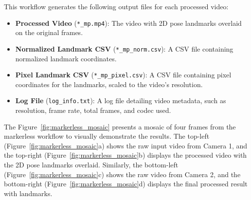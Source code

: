 \documentclass{article}
\begin{document}
This workflow generates the following output files for each processed video:

\begin{itemize}
    \item \textbf{Processed Video} (\texttt{*\_mp.mp4}): The video with 2D pose landmarks overlaid on the original frames.
    \item \textbf{Normalized Landmark CSV} (\texttt{*\_mp\_norm.csv}): A CSV file containing normalized landmark coordinates.
    \item \textbf{Pixel Landmark CSV} (\texttt{*\_mp\_pixel.csv}): A CSV file containing pixel coordinates for the landmarks, scaled to the video’s resolution.
    \item \textbf{Log File} (\texttt{log\_info.txt}): A log file detailing video metadata, such as resolution, frame rate, total frames, and codec used.
\end{itemize}

The Figure~\ref{fig:markerless_mosaic} presents a mosaic of four frames from the markerless workflow to visually demonstrate the results. The top-left (Figure~\ref{fig:markerless_mosaic}a) shows the raw input video from Camera 1, and the top-right (Figure~\ref{fig:markerless_mosaic}b) displays the processed video with the 2D pose landmarks overlaid. Similarly, the bottom-left (Figure~\ref{fig:markerless_mosaic}c) shows the raw video from Camera 2, and the bottom-right (Figure~\ref{fig:markerless_mosaic}d) displays the final processed result with landmarks.
\end{document}
